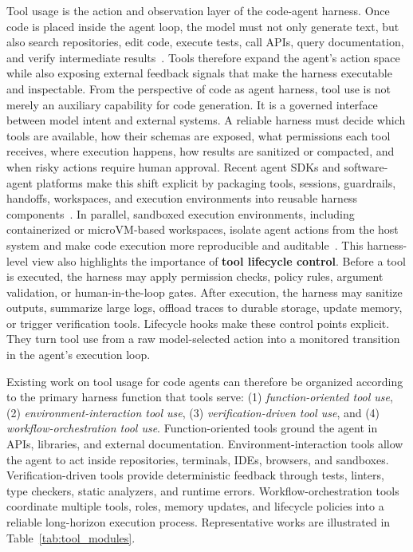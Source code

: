 Tool usage is the action and observation layer of the code-agent harness. Once code is placed inside the agent loop, the model must not only generate text, but also search repositories, edit code, execute tests, call APIs, query documentation, and verify intermediate results~\cite{watanabe2025use,sapkota2025vibe}. Tools therefore expand the agent's action space while also exposing external feedback signals that make the harness executable and inspectable. From the perspective of code as agent harness, tool use is not merely an auxiliary capability for code generation. It is a governed interface between model intent and external systems. A reliable harness must decide which tools are available, how their schemas are exposed, what permissions each tool receives, where execution happens, how results are sanitized or compacted, and when risky actions require human approval. Recent agent SDKs and software-agent platforms make this shift explicit by packaging tools, sessions, guardrails, handoffs, workspaces, and execution environments into reusable harness components~\cite{wang2024openhands,meng2026agent,xi2025agentgym}. In parallel, sandboxed execution environments, including containerized or microVM-based workspaces, isolate agent actions from the host system and make code execution more reproducible and auditable~\cite{cheng2026llm,wang2024executable,wang2025ui}.
This harness-level view also highlights the importance of \textbf{tool lifecycle control}. Before a tool is executed, the harness may apply permission checks, policy rules, argument validation, or human-in-the-loop gates. After execution, the harness may sanitize outputs, summarize large logs, offload traces to durable storage, update memory, or trigger verification tools. Lifecycle hooks make these control points explicit. They turn tool use from a raw model-selected action into a monitored transition in the agent's execution loop.



Existing work on tool usage for code agents can therefore be organized according to the primary harness function that tools serve: (1) \textit{function-oriented tool use}, (2) \textit{environment-interaction tool use}, (3) \textit{verification-driven tool use}, and (4) \textit{workflow-orchestration tool use}. 
Function-oriented tools ground the agent in APIs, libraries, and external documentation. Environment-interaction tools allow the agent to act inside repositories, terminals, IDEs, browsers, and sandboxes. Verification-driven tools provide deterministic feedback through tests, linters, type checkers, static analyzers, and runtime errors. Workflow-orchestration tools coordinate multiple tools, roles, memory updates, and lifecycle policies into a reliable long-horizon execution process.
Representative works are illustrated in Table~\ref{tab:tool_modules}.





